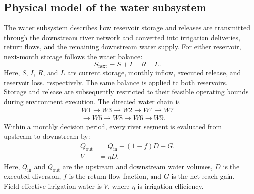 \documentclass [a4paper,fleqn] {cas-dc}
\begin{document}
\subsection{Physical model of the water subsystem} \label{sec22}
The water subsystem describes how reservoir storage and releases are transmitted through the downstream river network and converted into irrigation deliveries, return flows, and the remaining downstream water supply. For either reservoir, next-month storage follows the water balance: 
\begin{equation}
  S_{\mathrm{next}}=S+I-R-L.
  \label{eq:reservoir-balance}
\end{equation}
Here, $S$, $I$, $R$, and $L$ are current storage, monthly inflow, executed release, and reservoir loss, respectively. The same balance is applied to both reservoirs. Storage and release are subsequently restricted to their feasible operating bounds during environment execution. The directed water chain is
\[
\begin{gathered}
  W1\rightarrow W3\rightarrow W2\rightarrow W4\rightarrow W7\\[-2pt]
  {}\rightarrow W5\rightarrow W8\rightarrow W6\rightarrow W9.
\end{gathered}
\]
Within a monthly decision period, every river segment is evaluated from upstream to downstream by:
\begin{align}
  Q_{\mathrm{out}}&=Q_{\mathrm{in}}-(1-f)D+G.
  \label{eq:reach-transfer}\\
  V&=\eta D.
  \label{eq:field-effective-water}
\end{align}
Here, $Q_{\mathrm{in}}$ and $Q_{\mathrm{out}}$ are the upstream and downstream water volumes, $D$ is the executed diversion, $f$ is the return-flow fraction, and $G$ is the net reach gain. Field-effective irrigation water is $V$, where $\eta$ is irrigation efficiency.

\end{document}
